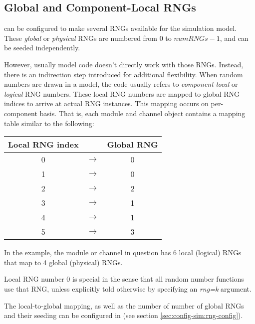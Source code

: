 \subsection{Global and Component-Local RNGs}
\label{sec:sim-lib:global-and-component-local-rngs}

{\opp} can be configured to make several RNGs available for the simulation
model. These \textit{global} or \textit{physical} RNGs are numbered from
$0$ to $numRNGs-1$, and can be seeded independently.

However, usually model code doesn't directly work with those RNGs. Instead,
there is an indirection step introduced for additional flexibility. When
random numbers are drawn in a model, the code usually refers to
\textit{component-local} or \textit{logical} RNG numbers. These
local RNG numbers are mapped to global RNG indices to arrive at
actual RNG instances. This mapping occurs on per-component basis. That is,
each module and channel object contains a mapping table similar to the
following:

\begin{center}
\begin{tabular}{ c c c }
Local RNG index &               & Global RNG \\ \hline
              0 & $\rightarrow$ & 0 \\
              1 & $\rightarrow$ & 0 \\
              2 & $\rightarrow$ & 2 \\
              3 & $\rightarrow$ & 1 \\
              4 & $\rightarrow$ & 1 \\
              5 & $\rightarrow$ & 3 \\
\end{tabular}
\end{center}

In the example, the module or channel in question has 6 local (logical)
RNGs that map to 4 global (physical) RNGs.

\begin{note}
Local RNG number 0 is special in the sense that all random number functions
use that RNG, unless explicitly told otherwise by specifying an \textit{rng=k}
argument.
\end{note}

The local-to-global mapping, as well as the number of number of global
RNGs and their seeding can be configured in  (see
section \ref{sec:config-sim:rng-config}).

